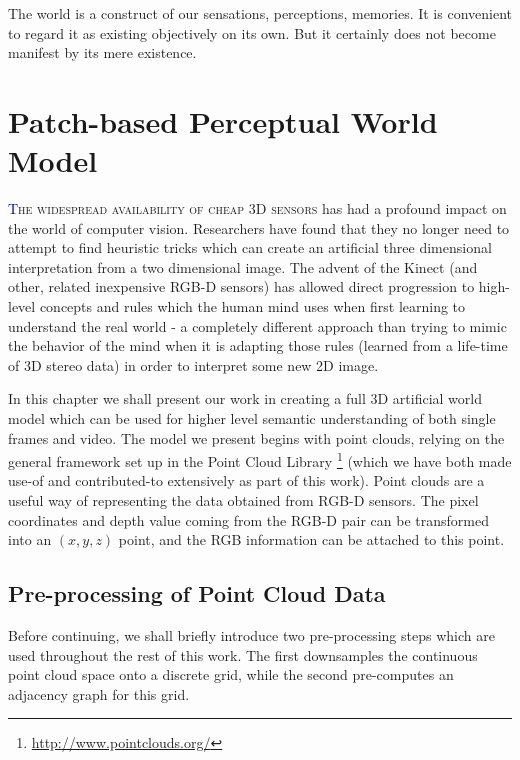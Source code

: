 \begin{savequote}[75mm]
The world is a construct of our sensations, perceptions, memories. It is convenient to regard it as existing objectively on its own. But it certainly does not become manifest by its mere existence.
\end{savequote}

\chapter{Patch-based Perceptual World Model}
\label{Chap:WorldModel}
\lettrine[lines=3, loversize=0.3]{\textcolor{DarkBlue}T}{he widespread availability of cheap 3D sensors} has had a profound impact on the world of computer vision. Researchers have found that they no longer need to attempt to find heuristic tricks which can create an artificial three dimensional interpretation from a two dimensional image. The advent of the Kinect (and other, related inexpensive RGB-D sensors) has allowed direct progression to high-level concepts and rules which the human mind uses when first learning to understand the real world - a completely different approach than trying to mimic the behavior of the mind when it is adapting those rules (learned from a life-time of 3D stereo data) in order to interpret some new 2D image.

In this chapter we shall present our work in creating a full 3D artificial world model which can be used for higher level semantic understanding of both single frames and video. The model we present begins with point clouds, relying on the general framework set up in the Point Cloud Library \footnote{\url{http://www.pointclouds.org/}} (which we have both made use-of and contributed-to extensively as part of this work). Point clouds are a useful way of representing the data obtained from RGB-D sensors. The pixel coordinates and depth value coming from the RGB-D pair can be transformed into an $(x,y,z)$ point, and the RGB information can be attached to this point.

\section{Pre-processing of Point Cloud Data}
Before continuing, we shall briefly introduce two pre-processing steps which are used throughout the rest of this work. The first downsamples the continuous point cloud space onto a discrete grid, while the second pre-computes an adjacency graph for this grid.

